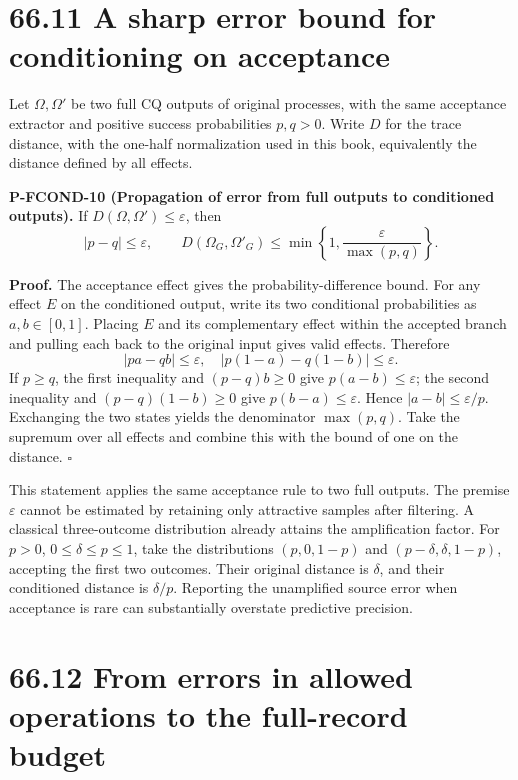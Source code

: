 \documentclass[
  11pt,
  oneside]{book}
\begin{document}
\section{66.11 A sharp error bound for conditioning on acceptance}

Let \(\Omega,\Omega'\) be two full CQ outputs of original processes,
with the same acceptance extractor and positive success probabilities
\(p,q>0\). Write \(D\) for the trace distance, with the one-half
normalization used in this book, equivalently the distance defined by
all effects.

\label{p-fcond-10}{} \textbf{P-FCOND-10 (Propagation of
error from full outputs to conditioned outputs).} If
\(D(\Omega,\Omega')\le\varepsilon\), then \[
|p-q|\le\varepsilon,\qquad
D(\Omega_G,\Omega'_G)\le
\min\left\{1,\frac{\varepsilon}{\max(p,q)}\right\}.
\]

\textbf{Proof.} The acceptance effect gives the probability-difference
bound. For any effect \(E\) on the conditioned output, write its two
conditional probabilities as \(a,b\in[0,1]\). Placing \(E\) and its
complementary effect within the accepted branch and pulling each back to
the original input gives valid effects. Therefore \[
|pa-qb|\le\varepsilon,\quad
|p(1-a)-q(1-b)|\le\varepsilon.
\] If \(p\ge q\), the first inequality and \((p-q)b\ge0\) give
\(p(a-b)\le\varepsilon\); the second inequality and \((p-q)(1-b)\ge0\)
give \(p(b-a)\le\varepsilon\). Hence \(|a-b|\le\varepsilon/p\).
Exchanging the two states yields the denominator \(\max(p,q)\). Take the
supremum over all effects and combine this with the bound of one on the
distance. \(\square\)

This statement applies the same acceptance rule to two full outputs. The
premise \(\varepsilon\) cannot be estimated by retaining only attractive
samples after filtering. A classical three-outcome distribution already
attains the amplification factor. For \(p>0\), \(0\le\delta\le p\le1\),
take the distributions \((p,0,1-p)\) and \((p-\delta,\delta,1-p)\),
accepting the first two outcomes. Their original distance is \(\delta\),
and their conditioned distance is \(\delta/p\). Reporting the
unamplified source error when acceptance is rare can substantially
overstate predictive precision.

\section{66.12 From errors in allowed operations to the full-record
budget}
\end{document}
